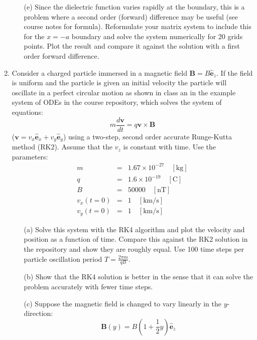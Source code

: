 \documentclass{article}
\begin{document}
\begin{enumerate}
\begin{itemize}
    \item[(e)]  Since the dielectric function varies rapidly at the boundary, this is a problem where a second order (forward) difference may be useful (see course notes for formula).  Reformulate your matrix system to include this for the $x=-a$ boundary and solve the system numerically for 20 grids points.  Plot the result and compare it against the solution with a first order forward difference.  
  \end{itemize}
  \item  Consider a charged particle immersed in a magnetic field $\mathbf{B} = B \hat{\mathbf{e}}_z$.  If the field is uniform and the particle is given an initial velocity the particle will oscillate in a perfect circular motion as shown in class an in the example system of ODEs in the course repository, which solves the system of equations:
    \begin{equation}
      m \frac{d \mathbf{v}}{dt} = q \mathbf{v} \times \mathbf{B}
    \end{equation}  
    ($\mathbf{v}=v_x \hat{\mathbf{e}}_x + v_y \hat{\mathbf{e}}_y$) using a two-step, second order accurate Runge-Kutta method (RK2).  Assume that the $v_z$ is constant with time.  Use the parameters:  
    \begin{eqnarray}
      m &=& 1.67 \times 10^{-27} \quad \mathrm{[kg]} \\
      q &=& 1.6 \times 10^{-19} \quad \mathrm{[C]} \\
      B &=& 50000 \quad \mathrm{[nT]} \\
      v_x(t=0) &=& 1 \quad \mathrm{[km/s]} \\
      v_y(t=0) &=& 1 \quad \mathrm{[km/s]} 
    \end{eqnarray}
  \begin{itemize}
    \item[(a)]  Solve this system with the RK4 algorithm and plot the velocity and position as a function of time.  Compare this against the RK2 solution in the repository and show they are roughly equal.  Use 100 time steps per particle oscillation period $T=\frac{2 \pi m}{q B}$.  
    \item[(b)]  Show that the RK4 solution is better in the sense that it can solve the problem accurately with fewer time steps.  
    \item[(c)]  Suppose the magnetic field is changed to vary linearly in the $y$-direction:
    \begin{equation}
      \mathbf{B}(y) = B \left( 1+\frac{1}{2}y \right) \hat{\mathbf{e}}_z

\end{equation}
\end{itemize}
\end{enumerate}
\end{document}
